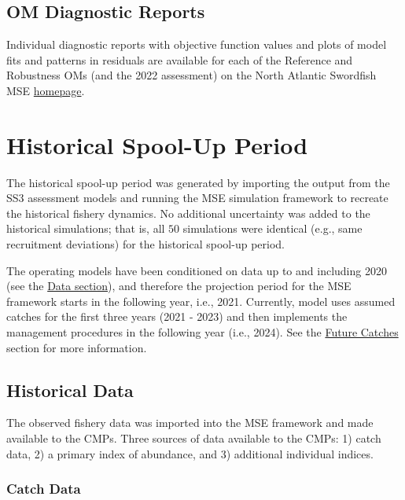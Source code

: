 \documentclass[
]{article}
\begin{document}
\hypertarget{om-diagnostic-reports}{%
\subsection{OM Diagnostic Reports}\label{om-diagnostic-reports}}

Individual diagnostic reports with objective function values and plots of model fits and patterns in residuals are available for each of the Reference and Robustness OMs (and the 2022 assessment) on the North Atlantic Swordfish MSE \href{https://iccat.github.io/nswo-mse/}{homepage}.

\hypertarget{historical-spool-up-period}{%
\section{Historical Spool-Up Period}\label{historical-spool-up-period}}

The historical spool-up period was generated by importing the output from the SS3 assessment models and running the MSE simulation framework to recreate the historical fishery dynamics. No additional uncertainty was added to the historical simulations; that is, all \(50\) simulations were identical (e.g., same recruitment deviations) for the historical spool-up period.

The operating models have been conditioned on data up to and including 2020 (see the \protect\hyperlink{data}{Data section}), and therefore the projection period for the MSE framework starts in the following year, i.e., 2021. Currently, model uses assumed catches for the first three years (2021 - 2023) and then implements the management procedures in the following year (i.e., 2024). See the \protect\hyperlink{future-catches}{Future Catches} section for more information.

\hypertarget{historical-data}{%
\subsection{Historical Data}\label{historical-data}}

The observed fishery data was imported into the MSE framework and made available to the CMPs. Three sources of data available to the CMPs: 1) catch data, 2) a primary index of abundance, and 3) additional individual indices.

\hypertarget{catch-data}{%
\subsubsection{Catch Data}\label{catch-data}}
\end{document}
